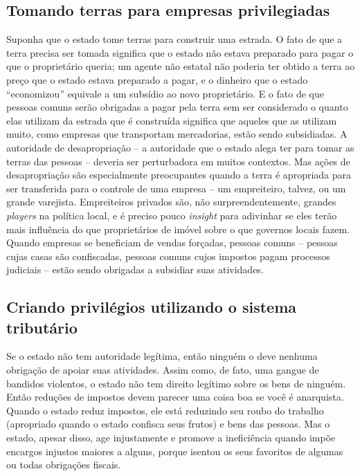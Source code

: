 \subsection*{Tomando terras para empresas privilegiadas}

Suponha que o estado tome terras para construir uma estrada. O fato de que a terra precisa ser tomada significa que o estado não estava preparado para pagar o que o proprietário queria; um agente não estatal não poderia ter obtido a terra ao preço que o estado estava preparado a pagar, e o dinheiro que o estado ``economizou'' equivale a um subsídio ao novo proprietário. E o fato de que pessoas comuns serão obrigadas a pagar pela terra sem ser considerado o quanto elas utilizam da estrada que é construída significa que aqueles que as utilizam muito, como empresas que transportam mercadorias, estão sendo subsidiadas. A autoridade de desapropriação -- a autoridade que o estado alega ter para tomar as terras das pessoas -- deveria ser perturbadora em muitos contextos. Mas ações de desapropriação são especialmente preocupantes quando a terra é apropriada para ser transferida para o controle de uma empresa -- um empreiteiro, talvez, ou um grande varejista. Empreiteiros privados são, não surpreendentemente, grandes \emph{players} na política local, e é preciso pouco \emph{insight} para adivinhar se eles terão mais influência do que proprietários de imóvel sobre o que governos locais fazem. Quando empresas se beneficiam de vendas forçadas, pessoas comuns -- pessoas cujas casas são confiscadas, pessoas comuns cujos impostos pagam processos judiciais -- estão sendo obrigadas a subsidiar suas atividades.

\subsection*{Criando privilégios utilizando o sistema tributário}

Se o estado não tem autoridade legítima, então ninguém o deve nenhuma obrigação de apoiar suas atividades. Assim como, de fato, uma gangue de bandidos violentos, o estado não tem direito legítimo sobre os bens de ninguém. Então reduções de impostos devem parecer uma coisa boa se você é anarquista. Quando o estado reduz impostos, ele está reduzindo seu roubo do trabalho (apropriado quando o estado confisca seus frutos) e bens das pessoas. Mas o estado, apesar disso, age injustamente e promove a ineficiência quando impõe encargos injustos maiores a alguns, porque isentou os seus favoritos de algumas ou todas obrigações fiscais.

